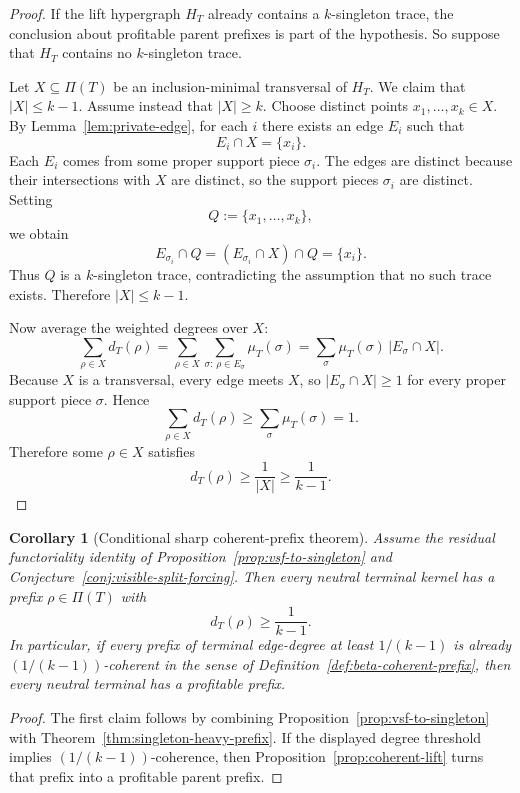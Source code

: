\documentclass[11pt]{article}
\newtheorem{corollary}[theorem]{Corollary}
\theoremstyle{definition}
\newcommand{\1}{\mathbf{1}}
\begin{document}
\begin{proof}
If the lift hypergraph $H_T$ already contains a $k$-singleton trace, the conclusion about profitable parent prefixes is part of the hypothesis.
So suppose that $H_T$ contains no $k$-singleton trace.

Let $X\subseteq \Pi(T)$ be an inclusion-minimal transversal of $H_T$.
We claim that $|X|\le k-1$.
Assume instead that $|X|\ge k$.
Choose distinct points $x_1,\dots,x_k\in X$.
By Lemma~\ref{lem:private-edge}, for each $i$ there exists an edge $E_i$ such that
\[
E_i\cap X=\{x_i\}.
\]
Each $E_i$ comes from some proper support piece $\sigma_i$.
The edges are distinct because their intersections with $X$ are distinct, so the support pieces $\sigma_i$ are distinct.
Setting
\[
Q:=\{x_1,\dots,x_k\},
\]
we obtain
\[
E_{\sigma_i}\cap Q=(E_{\sigma_i}\cap X)\cap Q=\{x_i\}.
\]
Thus $Q$ is a $k$-singleton trace, contradicting the assumption that no such trace exists.
Therefore $|X|\le k-1$.

Now average the weighted degrees over $X$:
\[
\sum_{\rho\in X} d_T(\rho)
=
\sum_{\rho\in X}\sum_{\sigma:\,\rho\in E_\sigma}\mu_T(\sigma)
=
\sum_\sigma \mu_T(\sigma)\,|E_\sigma\cap X|.
\]
Because $X$ is a transversal, every edge meets $X$, so $|E_\sigma\cap X|\ge 1$ for every proper support piece $\sigma$.
Hence
\[
\sum_{\rho\in X} d_T(\rho)\ge \sum_\sigma \mu_T(\sigma)=1.
\]
Therefore some $\rho\in X$ satisfies
\[
d_T(\rho)\ge \frac{1}{|X|}\ge \frac{1}{k-1}.
\]
\end{proof}

\begin{corollary}[Conditional sharp coherent-prefix theorem]\label{cor:singleton-sharp-coherence}
Assume the residual functoriality identity of Proposition~\ref{prop:vsf-to-singleton} and Conjecture~\ref{conj:visible-split-forcing}.
Then every neutral terminal kernel has a prefix $\rho\in \Pi(T)$ with
\[
d_T(\rho)\ge \frac{1}{k-1}.
\]
In particular, if every prefix of terminal edge-degree at least $1/(k-1)$ is already $(1/(k-1))$-coherent in the sense of Definition~\ref{def:beta-coherent-prefix}, then every neutral terminal has a profitable prefix.
\end{corollary}

\begin{proof}
The first claim follows by combining Proposition~\ref{prop:vsf-to-singleton} with Theorem~\ref{thm:singleton-heavy-prefix}.
If the displayed degree threshold implies $(1/(k-1))$-coherence, then Proposition~\ref{prop:coherent-lift} turns that prefix into a profitable parent prefix.
\end{proof}
\end{document}
